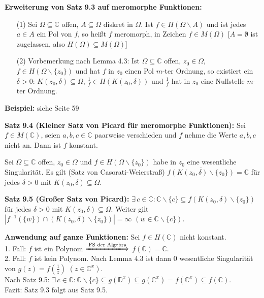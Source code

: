 \documentclass[11pt]{article}
\newcommand{\C}{\mathbb{C}}
\newcommand{\D}{\mathbb{D}}
\begin{document}
\textbf{Erweiterung von Satz 9.3 auf meromorphe Funktionen:}
\vspace{-0.6cm}  
\begin{itemize}
\item[(1)] Sei $\Omega \subseteq \C$ offen, $A \subseteq \Omega$ diskret in $\Omega$. Ist $f \in H(\Omega \backslash A)$ und ist jedes $a \in A$ ein Pol von $f$, so heißt $f$ meromorph, in Zeichen $f \in M(\Omega)$ [$A = \emptyset$ ist zugelassen, also $H(\Omega) \subseteq M(\Omega)$] \vspace{-0.2cm}
\item[(2)] Vorbemerkung nach Lemma 4.3: Ist $\Omega \subseteq \C$ offen, $z_0 \in \Omega$, $f \in H(\Omega \backslash \{ z_0 \})$ und hat $f$ in $z_0$ einen Pol $m$-ter Ordnung, so existiert ein $\delta > 0$: $K(z_0,\delta) \subseteq \Omega$, $\frac{1}{f} \in H(K(z_0, \delta))$ und $\frac{1}{f}$ hat in $z_0$ eine Nullstelle $m$-ter Ordnung.
\end{itemize}
\vspace{-0.3cm} 

\textbf{Beispiel:} siehe Seite 59

\textbf{Satz 9.4 (Kleiner Satz von Picard für meromorphe Funktionen):} Sei $f \in M(\C)$, seien $a,b,c \in \C$ paarweise verschieden und $f$ nehme die Werte $a,b,c$ nicht an. Dann ist $f$ konstant. 

Sei $\Omega \subseteq \C$ offen, $z_0 \in \Omega$ und $f \in H(\Omega \backslash \{ z_0 \})$ habe in $z_0$ eine wesentliche Singularität. Es gilt (Satz von Casorati-Weierstraß) $\overline{f(K(z_0, \delta)\backslash \{ z_0 \} )} = \C$ für jedes $\delta > 0$ mit $K(z_0, \delta) \subseteq \Omega$.

\textbf{Satz 9.5 (Großer Satz von Picard):} $\exists \, c \in \C \colon \C \backslash \{ c \} \subseteq f(K(z_0, \delta) \backslash \{ z_0 \})$ für jedes $\delta > 0$ mit $K(z_0, \delta) \subseteq \Omega$. Weiter gilt $|f^{-1}(\{ w \}) \cap (K(z_0, \delta) \backslash \{ z_0 \})| = \infty$ $(w \in \C \backslash \{ c \})$.

\textbf{Anwendung auf ganze Funktionen:} Sei $f \in H(\C)$ nicht konstant. \\
1. Fall: $f$ ist ein Polynom $\xLongrightarrow[]{\text{FS der Algebra}}$ $f(\C) = \C$. \\
2. Fall: $f$ ist kein Polynom. Nach Lemma 4.3 ist dann $0$ wesentliche Singularität von $g(z) = f(\frac{1}{z})$ $(z \in \C^x)$. \\
Nach Satz 9.5: $\exists \, c \in \C \colon \C \backslash \{ c \} \subseteq g(\D^x) \subseteq g(\C^x) = f(\C^x) \subseteq f(\C)$. \\
Fazit: Satz 9.3 folgt aus Satz 9.5.
\end{document}
